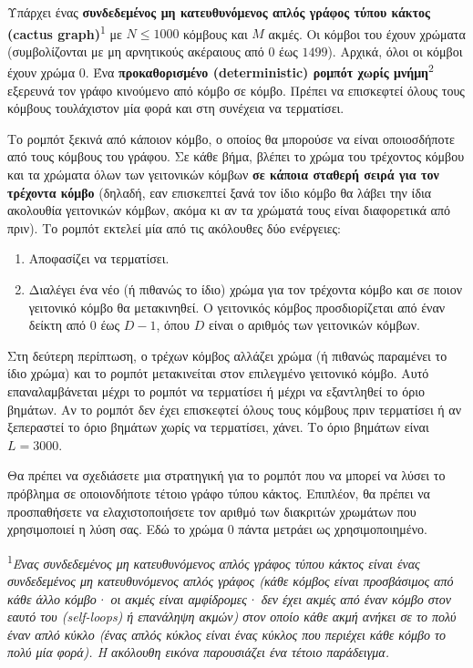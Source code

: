 \documentclass[12pt]{article}
\begin{document}
\renewcommand{\round}{Ημέρα 2}
\renewcommand{\problemName}{Πλοήγηση}
\renewcommand{\lang}{Ελληνικά}

\renewcommand{\tl}{$3$ δευτ.}
\renewcommand{\ml}{$512$ MB}
\problem{\problemName}

Υπάρχει ένας \textbf{συνδεδεμένος μη κατευθυνόμενος απλός γράφος τύπου κάκτος (cactus graph)}\textsuperscript{1} με $N \leq 1000$ κόμβους και $M$ ακμές. Οι κόμβοι του έχουν χρώματα (συμβολίζονται με μη αρνητικούς ακέραιους από $0$ έως $1499$). Αρχικά, όλοι οι κόμβοι έχουν χρώμα $0$. Ένα \textbf{προκαθορισμένο (deterministic) ρομπότ χωρίς μνήμη}\textsuperscript{2} εξερευνά τον γράφο κινούμενο από κόμβο σε κόμβο. Πρέπει να επισκεφτεί όλους τους κόμβους τουλάχιστον μία φορά και στη συνέχεια να τερματίσει.

Το ρομπότ ξεκινά από κάποιον κόμβο, ο οποίος θα μπορούσε να είναι οποιοσδήποτε από τους κόμβους του γράφου. Σε κάθε βήμα, βλέπει το χρώμα του τρέχοντος κόμβου και τα χρώματα όλων των γειτονικών κόμβων \textbf{σε κάποια σταθερή σειρά για τον τρέχοντα κόμβο} (δηλαδή, εαν επισκεπτεί ξανά τον ίδιο κόμβο θα λάβει την ίδια ακολουθία γειτονικών κόμβων, ακόμα κι αν τα χρώματά τους είναι διαφορετικά από πριν). Το ρομπότ εκτελεί μία από τις ακόλουθες δύο ενέργειες:
\begin{enumerate}
    \item Αποφασίζει να τερματίσει.
    \item Διαλέγει ένα νέο (ή πιθανώς το ίδιο) χρώμα για τον τρέχοντα κόμβο και σε ποιον γειτονικό κόμβο θα μετακινηθεί. Ο γειτονικός κόμβος προσδιορίζεται από έναν δείκτη από $0$ έως $D-1$, όπου $D$ είναι ο αριθμός των γειτονικών κόμβων.
\end{enumerate}

Στη δεύτερη περίπτωση, ο τρέχων κόμβος αλλάζει χρώμα (ή πιθανώς παραμένει το ίδιο χρώμα) και το ρομπότ μετακινείται στον επιλεγμένο γειτονικό κόμβο. Αυτό επαναλαμβάνεται μέχρι το ρομπότ να τερματίσει ή μέχρι να εξαντληθεί το όριο βημάτων. Αν το ρομπότ δεν έχει επισκεφτεί όλους τους κόμβους πριν τερματίσει ή αν ξεπεραστεί το όριο βημάτων χωρίς να τερματίσει, χάνει. Το όριο βημάτων είναι $L = 3000$.

Θα πρέπει να σχεδιάσετε μια στρατηγική για το ρομπότ που να μπορεί να λύσει το πρόβλημα σε οποιονδήποτε τέτοιο γράφο τύπου κάκτος. Επιπλέον, θα πρέπει να προσπαθήσετε να ελαχιστοποιήσετε τον αριθμό των διακριτών χρωμάτων που χρησιμοποιεί η λύση σας. Εδώ το χρώμα $0$ πάντα μετράει ως χρησιμοποιημένο.

\textsuperscript{1}\textit{Ένας συνδεδεμένος μη κατευθυνόμενος απλός γράφος τύπου κάκτος είναι ένας συνδεδεμένος μη κατευθυνόμενος απλός γράφος (κάθε κόμβος είναι προσβάσιμος από κάθε άλλο κόμβο· οι ακμές είναι αμφίδρομες· δεν έχει ακμές από έναν κόμβο στον εαυτό του (self-loops) ή επανάληψη ακμών) στον οποίο κάθε ακμή ανήκει σε το πολύ έναν απλό κύκλο (ένας απλός κύκλος είναι ένας κύκλος που περιέχει κάθε κόμβο το πολύ μία φορά). Η ακόλουθη εικόνα παρουσιάζει ένα τέτοιο παράδειγμα.}
\end{document}
